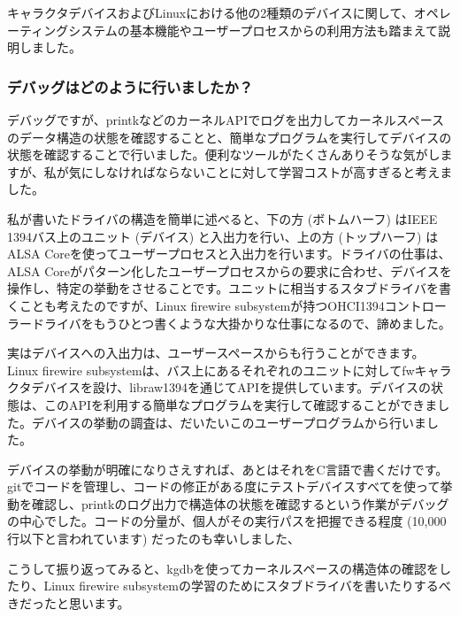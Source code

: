 \documentclass[mingoth,a4paper]{jsarticle}
\begin{document}
キャラクタデバイスおよびLinuxにおける他の2種類のデバイスに関して、オペレーティングシステムの基本機能やユーザープロセスからの利用方法も踏まえて説明しました。


\subsubsection{デバッグはどのように行いましたか？}

デバッグですが、printkなどのカーネルAPIでログを出力してカーネルスペースのデータ構造の状態を確認することと、簡単なプログラムを実行してデバイスの状態を確認することで行いました。便利なツールがたくさんありそうな気がしますが、私が気にしなければならないことに対して学習コストが高すぎると考えました。

私が書いたドライバの構造を簡単に述べると、下の方 (ボトムハーフ) はIEEE 1394バス上のユニット (デバイス) と入出力を行い、上の方 (トップハーフ) はALSA Coreを使ってユーザープロセスと入出力を行います。ドライバの仕事は、ALSA Coreがパターン化したユーザープロセスからの要求に合わせ、デバイスを操作し、特定の挙動をさせることです。ユニットに相当するスタブドライバを書くことも考えたのですが、Linux firewire subsystemが持つOHCI1394コントローラードライバをもうひとつ書くような大掛かりな仕事になるので、諦めました。

実はデバイスへの入出力は、ユーザースペースからも行うことができます。Linux firewire subsystemは、バス上にあるそれぞれのユニットに対してfwキャラクタデバイスを設け、libraw1394を通じてAPIを提供しています。デバイスの状態は、このAPIを利用する簡単なプログラムを実行して確認することができました。デバイスの挙動の調査は、だいたいこのユーザープログラムから行いました。

デバイスの挙動が明確になりさえすれば、あとはそれをC言語で書くだけです。gitでコードを管理し、コードの修正がある度にテストデバイスすべてを使って挙動を確認し、printkのログ出力で構造体の状態を確認するという作業がデバッグの中心でした。コードの分量が、個人がその実行パスを把握できる程度 (10,000行以下と言われています) だったのも幸いしました、

こうして振り返ってみると、kgdbを使ってカーネルスペースの構造体の確認をしたり、Linux firewire subsystemの学習のためにスタブドライバを書いたりするべきだったと思います。


\end{document}
